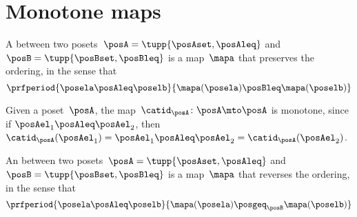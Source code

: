 
\section{Monotone maps}\label{sec:monotonicity-monotone-maps}


\begin{definition}
    \label{def:monotone}
    A \emph{} between two posets~$\posA=\tupp{\posAset, \posAleq}$ and~$\posB=\tupp{\posBset, \posBleq}$ is a map~$\mapa$ that preserves the ordering, in the sense that
    \begin{equation}
        \prfperiod{
            \posela \posAleq \poselb
        }{
            \mapa(\posela) \posBleq \mapa(\poselb)
        }
    \end{equation}
\end{definition}

\begin{remark}
    Given a poset~$\posA$, the map~$\catid_{\posA}\colon \posA \mto \posA$ is monotone, since if $\posAel_1\posAleq \posAel_2$, then $\catid_{\posA}(\posAel_1)=\posAel_1 \posAleq  \posAel_2 =  \catid_{\posA}(\posAel_2 )$.

\end{remark}

\begin{definition}
    \label{def:antitone}
    An \emph{} between two posets~$\posA=\tupp{\posAset, \posAleq}$ and~$\posB=\tupp{\posBset, \posBleq}$ is a map~$\mapa$ that reverses the ordering, in the sense that
    \begin{equation}
        \prfperiod{
            \posela \posAleq \poselb
        }{
            \mapa(\posela) \posgeq_\posB \mapa(\poselb)
        }
    \end{equation}
\end{definition}

